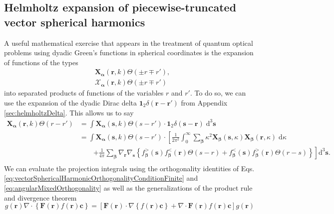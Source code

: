 \documentclass{article}
\begin{document}
\subsection{Helmholtz expansion of piecewise-truncated vector spherical harmonics}\label{sec:truncatedHarmonicExpansion}

A useful mathematical exercise that appears in the treatment of quantum optical problems using dyadic Green's functions in spherical coordinates is the expansion of functions of the types
\begin{equation}
\begin{split}
&\mathbf{X}_{\bm{\alpha}}(\mathbf{r},k)\Theta(\pm r\mp r'),\\
&\bm{\mathcal{X}}_{\bm{\alpha}}(\mathbf{r},k)\Theta(\pm r\mp r')
\end{split}
\end{equation}
into separated products of functions of the variables $r$ and $r'$. To do so, we can use the expansion of the dyadic Dirac delta $\bm{1}_2\delta(\mathbf{r} - \mathbf{r}')$ from Appendix \ref{sec:helmholtzDelta}. This allows us to say
\begin{equation}\label{eq:truncatedVectorHarmonicExpansion1}
\begin{split}
\mathbf{X}_{\bm{\alpha}}(\mathbf{r},k)\Theta(r - r') &= \int\mathbf{X}_{\bm{\alpha}}(\mathbf{s},k)\Theta(s - r')\cdot\bm{1}_2\delta(\mathbf{s} - \mathbf{r})\;\mathrm{d}^3\mathbf{s}\\
&= \int\mathbf{X}_{\bm{\alpha}}(\mathbf{s},k)\Theta(s - r')\cdot\left[\frac{1}{2\pi^2}\int_0^\infty\sum_{\bm{\beta}}\kappa^2\mathbf{X}_{\bm{\beta}}(\mathbf{s},\kappa)\mathbf{X}_{\bm{\beta}}(\mathbf{r},\kappa)\;\mathrm{d}\kappa\right.\\
&\qquad\left.+ \frac{1}{4\pi}\sum_{\bm{\beta}}\nabla_\mathbf{r}\nabla_\mathbf{s}\left\{ f_{\bm{\beta}}^>(\mathbf{s})f_{\bm{\beta}}^<(\mathbf{r})\Theta(s - r) +  f_{\bm{\beta}}^<(\mathbf{s})f_{\bm{\beta}}^>(\mathbf{r})\Theta(r - s)\right\}\right]\mathrm{d}^3\mathbf{s}.\\
\end{split}
\end{equation}
We can evaluate the projection integrals using the orthogonality identities of Eqs. \eqref{eq:vectorSphericalHarmonicOrthogonalityConditionFinite} and \eqref{eq:angularMixedOrthogonality} as well as the generalizations of the product rule and divergence theorem
\begin{equation}\label{eq:generalizedProductRule}
g(\mathbf{r})\nabla\cdot\left\{\mathbf{F}(\mathbf{r})f(\mathbf{r})\mathbf{c}\right\} = \left[\mathbf{F}(\mathbf{r})\cdot\nabla \left\{f(\mathbf{r})\mathbf{c}\right\} + \nabla\cdot\mathbf{F}(\mathbf{r})f(\mathbf{r})\mathbf{c}\right]g(\mathbf{r})
\end{equation}
\end{document}
